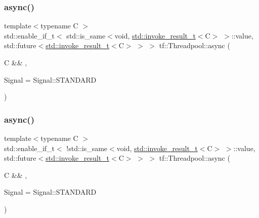 \subsubsection{\texorpdfstring{async()}{async()}\hspace{0.1cm}{\footnotesize\ttfamily [1/2]}}
{\footnotesize\ttfamily template$<$typename C $>$ \\
std\+::enable\+\_\+if\+\_\+t$<$ std\+::is\+\_\+same$<$void, \hyperlink{namespacestd_a492e7f3c5595a8b7a7c6e0c9294f5c81}{std\+::invoke\+\_\+result\+\_\+t}$<$C$>$ $>$\+::value, std\+::future$<$\hyperlink{namespacestd_a492e7f3c5595a8b7a7c6e0c9294f5c81}{std\+::invoke\+\_\+result\+\_\+t}$<$C$>$ $>$ $>$ tf\+::\+Threadpool\+::async (\begin{DoxyParamCaption}\item[{C \&\&}]{,  }\item[{Signal}]{ = {\ttfamily Signal\+:\+:STANDARD} }\end{DoxyParamCaption})}

\mbox{\label{classtf_1_1Threadpool_a6c2cc2938ef035c303d2a43e5c15fcca}} 
\subsubsection{\texorpdfstring{async()}{async()}\hspace{0.1cm}{\footnotesize\ttfamily [2/2]}}
{\footnotesize\ttfamily template$<$typename C $>$ \\
std\+::enable\+\_\+if\+\_\+t$<$ !std\+::is\+\_\+same$<$void, \hyperlink{namespacestd_a492e7f3c5595a8b7a7c6e0c9294f5c81}{std\+::invoke\+\_\+result\+\_\+t}$<$C$>$ $>$\+::value, std\+::future$<$\hyperlink{namespacestd_a492e7f3c5595a8b7a7c6e0c9294f5c81}{std\+::invoke\+\_\+result\+\_\+t}$<$C$>$ $>$ $>$ tf\+::\+Threadpool\+::async (\begin{DoxyParamCaption}\item[{C \&\&}]{,  }\item[{Signal}]{ = {\ttfamily Signal\+:\+:STANDARD} }\end{DoxyParamCaption})}

\mbox{\label{classtf_1_1Threadpool_a7aaf377c9298f4b09a59af4a960a32ec}} 
